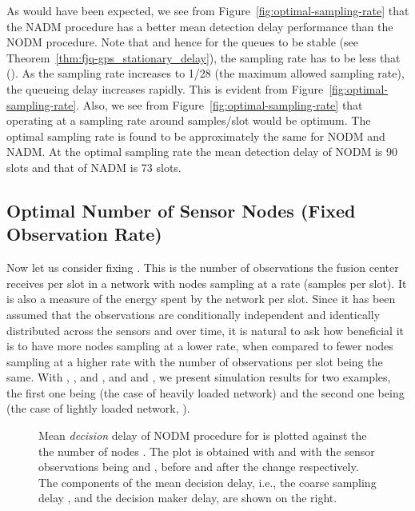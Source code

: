 \documentclass[acmtosn]{acmtrans2m}
\begin{document}
As would have been expected, we see from Figure~\ref{fig:optimal-sampling-rate} 
that the {\sf NADM} procedure has a better mean detection delay performance than 
the {\sf NODM} procedure. Note that  and hence for the queues 
to be stable (see Theorem~\ref{thm:fjq-gps_stationary_delay}), the sampling rate
has to be less that  (). As the sampling 
rate  increases to 1/28 (the maximum allowed sampling rate), the queueing delay 
increases rapidly. This is evident from Figure~\ref{fig:optimal-sampling-rate}. Also, 
we see from Figure~\ref{fig:optimal-sampling-rate} that operating at a sampling rate 
around  samples/slot would be optimum. The optimal sampling 
rate is found to be approximately the same for {\sf NODM} and {\sf NADM}. At the 
optimal sampling rate the mean detection delay of {\sf NODM} is 90 slots and that 
of {\sf NADM} is 73 slots.


\subsection{Optimal Number of Sensor Nodes (Fixed Observation Rate)}


Now let us consider fixing . This is the number of observations the 
fusion center receives per slot in a network with  nodes sampling at a rate 
 (samples per slot). It is also a measure of the energy spent by the network 
per slot. Since it has been assumed that the observations are conditionally 
independent and identically distributed across the sensors and over time, it is 
natural to ask how beneficial it is to have more nodes sampling at a lower rate, 
when compared to fewer nodes sampling at a higher rate with the number of 
observations per slot being the same. With , , and
, and  and , we 
present simulation results for two examples, the first one being  (the 
case of heavily loaded network) and the second one being  (the case 
of lightly loaded network, ).


\begin{figure}[t]
   \begin{center}
   \begin{minipage}{3.8cm}
   \begin{center}
   \end{center}
   \end{minipage}
\hspace{25mm}
   \begin{minipage}{3.8cm}
   \begin{center}
   \end{center}
   \end{minipage}
  \caption{Mean \emph{decision} delay of {\sf NODM} procedure for  is plotted
    against the the number of nodes . The plot is obtained with 
     and with the sensor observations
    being  and , before and after the
    change respectively. The components of the mean decision delay, i.e., the coarse sampling delay 
    , and the
    decision maker delay,  are shown on the right.}
  \label{fig:decision-delay}
  \end{center}
 \end{figure}
\end{document}
